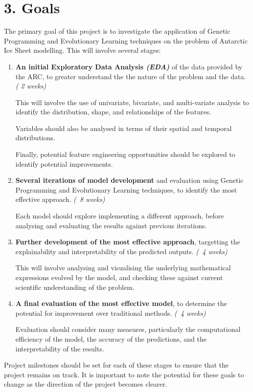 \documentclass[11pt, a4paper, twoside, openright]{report}
\begin{document}
\section*{3. Goals}

The primary goal of this project is to investigate the
application of Genetic Programming and Evolutionary Learning
techniques on the problem of Antarctic Ice Sheet modelling.
This will involve several stages:
\begin{enumerate}
\item \textbf{An initial Exploratory Data Analysis \textit{(EDA)}} of
  the data provided by the ARC, to greater understand the
  the nature of the problem and the data. \textit{( 2 weeks)}
  
  This will involve the use of univariate, bivariate, 
  and multi-variate analysis to identify the distribution,
  shape, and relationships of the features.

  Variables should also be analysed in terms of their 
  spatial and temporal distributions.
  
  Finally, potential feature engineering opportunities
  should be explored to identify potential improvements.
\item \textbf{Several iterations of model development} and evaluation
  using Genetic Programming and Evolutionary Learning
  techniques, to identify the most effective approach.
  \textit{(~8 weeks)}

  Each model should explore implementing a different
  approach, before analysing and evaluating the results
  against previous iterations.
\item \textbf{Further development of the most effective approach},
  targetting the explainability and interpretability of
  the predicted outputs. \textit{(~4 weeks)}

  This will involve analysing and visualising the
  underlying mathematical expressions evolved by the model,
  and checking these against current scientific
  understanding of the problem.
\item \textbf{A final evaluation of the most effective model}, to
  determine the potential for improvement over traditional
  methods. \textit{(~4 weeks)}

  Evaluation should consider many measures, particularly the
  computational efficiency of the model, the accuracy of the
  predictions, and the interpretability of the results.
\end{enumerate}
Project milestones should be set for each of these stages
to ensure that the project remains on track. It is important
to note the potential for these goals to change as the 
direction of the project becomes clearer.
\end{document}
